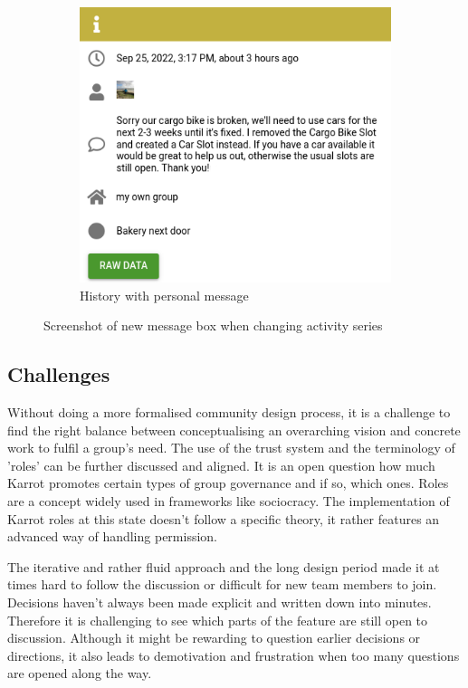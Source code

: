 \documentclass[
	a4paper,%
	11pt,%
	]{article}
\begin{document}
\begin{figure}[ht]
\begin{subfigure}{0.55\textwidth}
\centering
\includegraphics[width = \textwidth]{images/screenshot_activities_history.png}
\caption{History with personal message}
\end{subfigure}
\caption{Screenshot of new message box when changing activity series}
\label{fig:screenshot-history}
\end{figure}


\newpage


\subsection{Challenges}


Without doing a more formalised community design process, it is a challenge to find the right balance between conceptualising an overarching vision and concrete work to fulfil a group's need. The use of the trust system and the terminology of 'roles' can be further discussed and aligned. It is an open question how much Karrot promotes certain types of group governance and if so, which ones. Roles are a concept widely used in frameworks like sociocracy. The implementation of Karrot roles at this state doesn't follow a specific theory, it rather features an advanced way of handling permission.

The iterative and rather fluid approach and the long design period made it at times hard to follow the discussion or difficult for new team members to join. Decisions haven't always been made explicit and written down into minutes. Therefore it is challenging to see which parts of the feature are still open to discussion. Although it might be rewarding to question earlier decisions or directions, it also leads to demotivation and frustration when too many questions are opened along the way.
\end{document}
